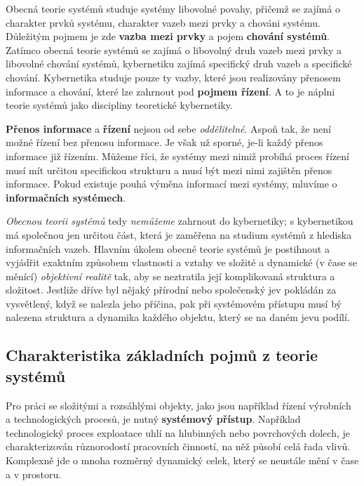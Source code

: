     Obecná teorie systémů studuje systémy libovolné povahy, přičemž se zajímá o charakter prvků 
     systému, charakter vazeb mezi prvky a chováni systému. Důležitým pojmem je zde \textbf{vazba 
     mezi prvky} a pojem \textbf{chování systémů}. Zatímco obecná teorie systémů se zajímá o 
     libovolný druh vazeb mezi prvky a libovolné chování systémů, kybernetiku zajímá specifický 
     druh vazeb a specifické chování. Kybernetika studuje pouze ty vazby, které jsou realizovány 
     přenosem informace a chování, které lze zahrnout pod \textbf{pojmem řízení}. A to je náplni 
     teorie systémů jako discipliny teoretické kybernetiky.
     
     \textbf{Přenos informace} a \textbf{řízení} nejsou od sebe \emph{oddělitelné}. Aspoň tak, že 
     není možné řízení bez přenosu informace. Je však už sporné, je-li každý přenos informace již 
     řízením. Můžeme říci, že systémy mezi nimiž probíhá proces řízení musí mít určitou specifickou 
     strukturu a musí být mezi nimi zajištěn přenos informace. Pokud existuje pouhá výměna 
     informací mezi systémy, mluvíme o \textbf{informačních systémech}.
     
     \emph{Obecnou teorii systémů} tedy \emph{nemůžeme} zahrnout do kybernetiky; s kybernetikou má 
     společnou jen určitou část, která je zaměřena na studium systémů z hlediska informačních 
     vazeb. Hlavním úkolem obecné teorie systémů je postihnout a vyjádřit exaktním způsobem 
     vlastnosti a vztahy ve složité a dynamické (v čase se měnící) \emph{objektivní realitě} tak, 
     aby se neztratila její komplikovaná struktura a složitost. Jestliže dříve byl nějaký přírodní 
     nebo společenský jev pokládán za vysvětlený, když se nalezla jeho příčina, pak při systémovém 
     přístupu musí bý nalezena struktura a dynamika každého objektu, který se na daném jevu podílí.
     
     \subsection{Charakteristika základních pojmů z teorie systémů}
       Pro práci se složitými a rozsáhlými objekty, jako jsou například řízení výrobních a
       technologických procesů, je nutný \textbf{systémový přístup}. Například technologický proces
       exploatace uhlí na hlubinných nebo povrchových dolech, je charakterizován různorodostí
       pracovních činností, na něž působí celá řada vlivů. Komplexně jde o mnoha rozměrný
       dynamický celek, který se neustále mění v čase a v prostoru.
       
